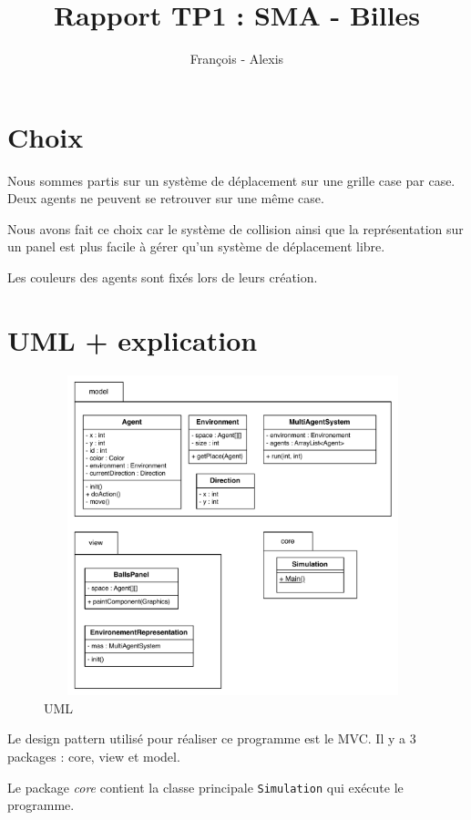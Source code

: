\documentclass[a4paper,10pt]{article}
\title{Rapport TP1 : SMA - Billes}
\author{Fran\c{c}ois \bsc{Lepan} - Alexis \bsc{Linke}}
\begin{document}
\maketitle

\section{Choix}

Nous sommes partis sur un syst\`eme de d\'eplacement sur une grille case par case. Deux agents ne peuvent  se retrouver sur une m\^eme case.

Nous avons fait ce choix car le syst\`eme de collision ainsi que la repr\'esentation sur un panel est plus facile \`a g\'erer qu'un syst\`eme de d\'eplacement libre.

Les couleurs des agents sont fix\'es lors de leurs cr\'eation.

\section{UML + explication}

\begin{figure}[ht]
\begin{center}
	\includegraphics[height=9.3cm , width=11cm]{uml/sci_uml_tp1.pdf}
\end{center}
	\caption{UML}
	\label{uml}
\end{figure}

\newpage 

Le design pattern utilis\'e pour r\'ealiser ce programme est le MVC.  Il y a 3 packages : core, view et model. 

Le package \emph{core} contient la classe principale \verb&Simulation& qui ex\'ecute le programme. 
\end{document}

